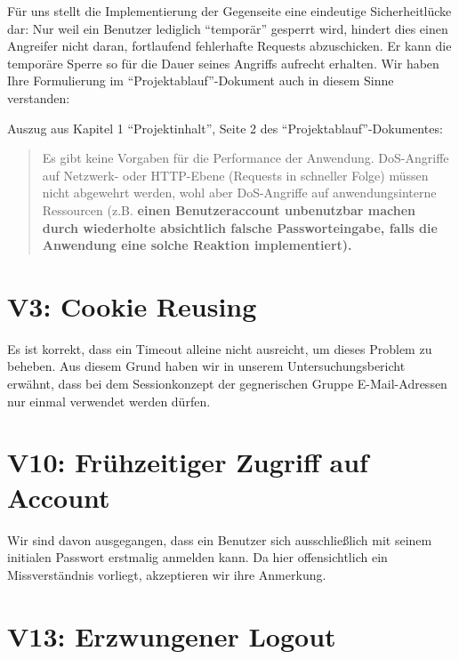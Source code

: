 \documentclass[12pt,DIV14,BCOR10mm,a4paper,parskip=half-,headsepline,headinclude,english,ngerman,bibliography=totocnumbered]{scrreprt}
\begin{document}
Für uns stellt die Implementierung der Gegenseite eine eindeutige Sicherheitlücke dar: Nur weil ein Benutzer lediglich \enquote{temporär} gesperrt wird, hindert dies einen Angreifer nicht daran, fortlaufend fehlerhafte Requests abzuschicken. Er kann die temporäre Sperre so für die Dauer seines Angriffs aufrecht erhalten. Wir haben Ihre Formulierung im \enquote{Projektablauf}-Dokument auch in diesem Sinne verstanden:

Auszug aus Kapitel 1 \enquote{Projektinhalt}, Seite 2 des \enquote{Projektablauf}-Dokumentes:

\blockquote{
Es gibt keine Vorgaben für die Performance der Anwendung. DoS-Angriffe auf Netzwerk- oder HTTP-Ebene (Requests in schneller Folge) müssen nicht abgewehrt werden, wohl aber DoS-Angriffe auf anwendungsinterne Ressourcen (z.B. \textbf{einen Benutzeraccount unbenutzbar machen durch wiederholte absichtlich falsche Passworteingabe, falls die Anwendung eine solche Reaktion implementiert).}
}

\section{V3: Cookie Reusing}

Es ist korrekt, dass ein Timeout alleine nicht ausreicht, um dieses Problem zu beheben.
Aus diesem Grund haben wir in unserem Untersuchungsbericht erwähnt, dass bei dem Sessionkonzept der gegnerischen Gruppe E-Mail-Adressen nur einmal verwendet werden dürfen.

\section{V10: Frühzeitiger Zugriff auf Account}

Wir sind davon ausgegangen, dass ein Benutzer sich ausschließlich mit seinem initialen Passwort erstmalig anmelden kann.
Da hier offensichtlich ein Missverständnis vorliegt, akzeptieren wir ihre Anmerkung.

\section{V13: Erzwungener Logout}
\end{document}
